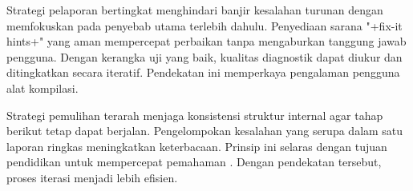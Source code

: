 \documentclass[../main.tex]{subfiles}
\begin{document}
Strategi pelaporan bertingkat menghindari banjir kesalahan turunan dengan memfokuskan pada penyebab utama terlebih dahulu. Penyediaan sarana "+fix-it hints+" yang aman mempercepat perbaikan tanpa mengaburkan tanggung jawab pengguna. Dengan kerangka uji yang baik, kualitas diagnostik dapat diukur dan ditingkatkan secara iteratif. Pendekatan ini memperkaya pengalaman pengguna alat kompilasi.

\IfSubfilesClassLoaded{


}{}

Strategi pemulihan terarah menjaga konsistensi struktur internal agar tahap berikut tetap dapat berjalan. Pengelompokan kesalahan yang serupa dalam satu laporan ringkas meningkatkan keterbacaan. Prinsip ini selaras dengan tujuan pendidikan untuk mempercepat pemahaman \citep{Mogensen2010}. Dengan pendekatan tersebut, proses iterasi menjadi lebih efisien.

\IfSubfilesClassLoaded{%


}{}
\end{document}
